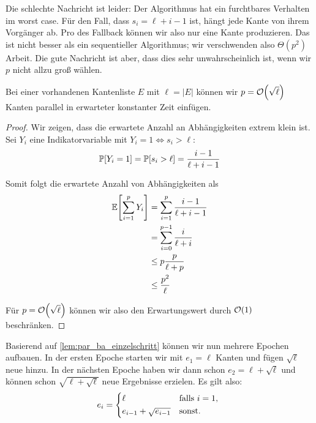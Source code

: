 Die schlechte Nachricht ist leider:
Der Algorithmus hat ein furchtbares Verhalten im worst case.
Für den Fall, dass $s_i = \ell + i - 1$ ist, hängt jede Kante von ihrem Vorgänger ab.
Pro  des Fallback können wir also nur eine Kante produzieren.
Das ist nicht besser als ein sequentieller Algorithmus; wir verschwenden also $\Theta(p^2)$ Arbeit.
Die gute Nachricht ist aber, dass dies sehr unwahrscheinlich ist, wenn wir $p$ nicht allzu groß wählen.

\begin{lemma}\label{lem:par_ba_einzelschritt}
    Bei  einer vorhandenen Kantenliste $E$ mit $\ell = |E|$ können wir $p = \mathcal{O}\!\left(\sqrt{\ell}\right)$ Kanten parallel in erwarteter konstanter Zeit einfügen.
\end{lemma}

\begin{proof}
    Wir zeigen, dass die erwartete Anzahl an Abhängigkeiten extrem klein ist.
    Sei $Y_i$ eine Indikatorvariable mit $Y_i = 1 \Leftrightarrow s_i > \ell$:
    \begin{equation}
        \mathbb{P}\!\left[Y_i = 1\right] = \mathbb{P}\!\left[s_i > \ell\right] = \frac{i - 1}{\ell + i - 1}
    \end{equation}

    \noindent
    Somit folgt die erwartete Anzahl von Abhängigkeiten als
    \begin{align}
        \mathbb{E}\!\left[\sum_{i=1}^p Y_i\right] & = \sum_{i=1}^{p} \frac{i - 1}{\ell + i - 1} \\
                                & = \sum_{i=0}^{p-1} \frac{i}{\ell + i}       \\
                                & \le p \frac{p}{\ell + p}                    \\
                                & \le \frac{p^2}{\ell}
    \end{align}

    \noindent
    Für $p = \mathcal{O}\!\left(\sqrt{\ell}\right)$ können wir also den Erwartungswert durch $\mathcal{O}\!\left(1\right)$  beschränken.
\end{proof}

Basierend auf \cref{lem:par_ba_einzelschritt} können wir nun mehrere Epochen aufbauen.
In der ersten Epoche starten wir mit $e_1 = \ell$ Kanten und fügen $\sqrt{\ell}$ neue hinzu.
In der nächsten Epoche haben wir dann schon $e_2 = \ell + \sqrt{\ell}$ und können schon $\sqrt{\ell + \sqrt{\ell}}$ neue Ergebnisse erzielen.
Es gilt also:
\begin{equation}
    e_i = \begin{cases*}
        \ell                     & falls $i = 1$, \\
        e_{i-1} + \sqrt{e_{i-1}} & sonst.
    \end{cases*}
\end{equation}

